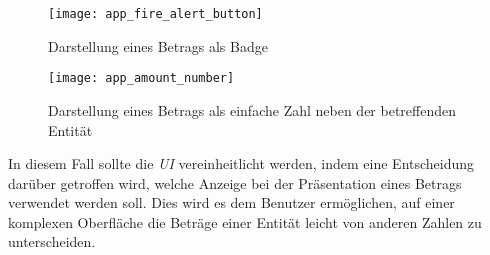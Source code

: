 \begin{figure}[H]
  \centering
  \texttt{[image: app\_fire\_alert\_button]}
  \caption{Darstellung eines Betrags als Badge}
  \label{fig:app_fire_alert_button_badge}
\end{figure}

\begin{figure}[H]
  \centering
  \texttt{[image: app\_amount\_number]}
  \caption{Darstellung eines Betrags als einfache Zahl neben der betreffenden Entität}
  \label{fig:app_amount_number}
\end{figure}

In diesem Fall sollte die \textit{UI} vereinheitlicht werden, indem eine Entscheidung darüber getroffen wird, welche Anzeige bei der Präsentation eines Betrags verwendet werden soll.
Dies wird es dem Benutzer ermöglichen, auf einer komplexen Oberfläche die Beträge einer Entität leicht von anderen Zahlen zu unterscheiden.
